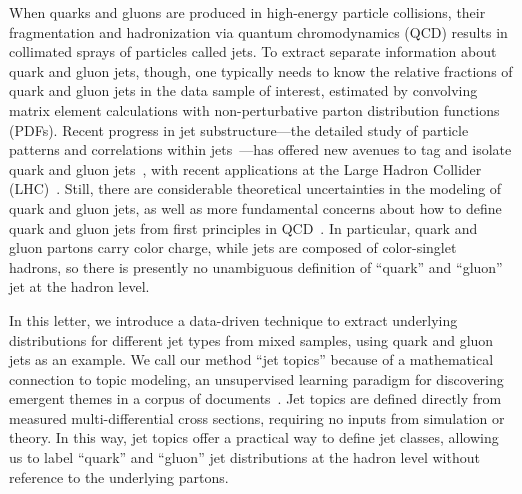 \documentclass[aps,prl,floatfix,preprintnumbers,twocolumn,groupedaddress,nofootinbib,longbibliography]{revtex4-1}
\begin{document}
When quarks and gluons are produced in high-energy particle collisions, their fragmentation and hadronization via quantum chromodynamics (QCD) results in collimated sprays of particles called jets.
%
To extract separate information about quark and gluon jets, though, one typically needs to know the relative fractions of quark and gluon jets in the data sample of interest, estimated by convolving matrix element calculations with non-perturbative parton distribution functions (PDFs).
%
Recent progress in jet substructure---the detailed study of particle patterns and correlations within jets~\cite{Seymour:1991cb,Seymour:1993mx,Butterworth:2002tt,Butterworth:2007ke,Butterworth:2008iy,Abdesselam:2010pt,Altheimer:2012mn,Altheimer:2013yza,Adams:2015hiv,Larkoski:2017jix}---has offered new avenues to tag and isolate quark and gluon jets~\cite{Nilles:1980ys,Jones:1988ay,Fodor:1989ir,Jones:1990rz,Lonnblad:1990qp,Pumplin:1991kc,Gallicchio:2011xq,Gallicchio:2012ez,Larkoski:2013eya,Larkoski:2014pca,Bhattacherjee:2015psa,FerreiradeLima:2016gcz,Komiske:2016rsd,ATLAS:2016wzt,Davighi:2017hok,Frye:2017yrw}, with recent applications at the Large Hadron Collider (LHC)~\cite{
CMS:2013kfa,Aad:2014gea,Aad:2014bia,Khachatryan:2014dea,Aad:2015owa,Khachatryan:2015bnx,Aad:2016oit,CMS-DP-2016-070,Aaboud:2017jcu}.
%
Still, there are considerable theoretical uncertainties in the modeling of quark and gluon jets, as well as more fundamental concerns about how to define quark and gluon jets from first principles in QCD~\cite{Banfi:2006hf,Gras:2017jty,Reichelt:2017hts,Mo:2017gzp}.
%
In particular, quark and gluon partons carry color charge, while jets are composed of color-singlet hadrons, so there is presently no unambiguous definition of ``quark'' and ``gluon'' jet at the hadron level.

In this letter, we introduce a data-driven technique to extract underlying distributions for different jet types from mixed samples, using quark and gluon jets as an example.
%
We call our method ``jet topics'' because of a mathematical connection to topic modeling, an unsupervised learning paradigm for discovering emergent themes in a corpus of documents~\cite{blei2012probabilistic}.
%
Jet topics are defined directly from measured multi-differential cross sections, requiring no inputs from simulation or theory.
%
In this way, jet topics offer a practical way to define jet classes, allowing us to label ``quark'' and ``gluon'' jet distributions at the hadron level without reference to the underlying partons. 
\end{document}
